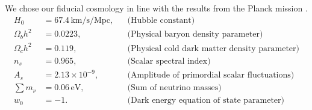 \documentclass[11pt]{article} %
\begin{document}






We chose our fiducial cosmology in line with the results from the Planck mission \cite{planckresults}.
\begin{align*}
    H_0 &= 67.4 \, \text{km/s/Mpc}, && \text{(Hubble constant)} \\
    \Omega_b h^2 &= 0.0223, && \text{(Physical baryon density parameter)} \\
    \Omega_c h^2 &= 0.119, && \text{(Physical cold dark matter density parameter)} \\
    n_s &= 0.965, && \text{(Scalar spectral index)} \\
    A_s &= 2.13 \times 10^{-9}, && \text{(Amplitude of primordial scalar fluctuations)} \\
    \sum m_\nu &= 0.06 \, \text{eV}, && \text{(Sum of neutrino masses)} \\
    w_0 &= -1. && \text{(Dark energy equation of state parameter)}
\end{align*}
\end{document}
